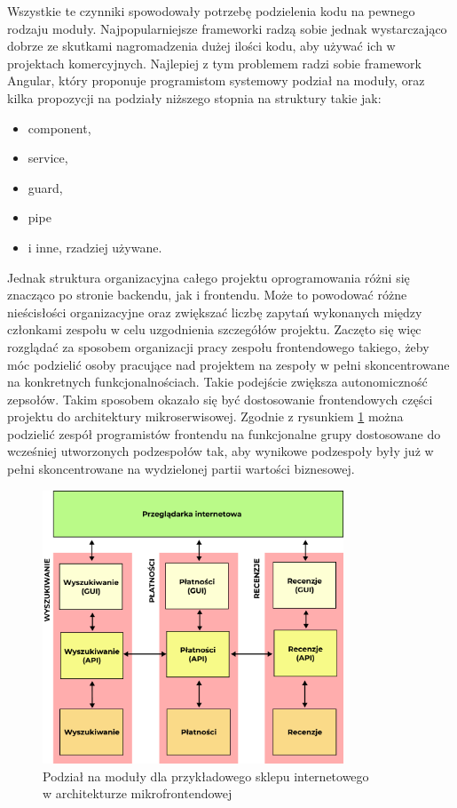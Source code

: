\documentclass{SGGW-thesis}
\begin{document}
Wszystkie te czynniki spowodowały potrzebę podzielenia kodu na pewnego rodzaju moduły. Najpopularniejsze frameworki radzą sobie jednak wystarczająco dobrze ze skutkami nagromadzenia dużej ilości kodu, aby używać ich w projektach komercyjnych. Najlepiej z tym problemem radzi sobie framework Angular, który proponuje programistom systemowy podział na moduły, oraz kilka propozycji na podziały niższego stopnia na struktury takie jak:

\begin{itemize}
	\item component,
	\item service,
	\item guard,
	\item pipe
	\item i inne, rzadziej używane.
\end{itemize}

Jednak struktura organizacyjna całego projektu oprogramowania różni się znacząco po stronie backendu, jak i frontendu. Może to powodować różne nieścisłości organizacyjne oraz zwiększać liczbę zapytań wykonanych między członkami zespołu w celu uzgodnienia szczegółów projektu. Zaczęto się więc rozglądać za sposobem organizacji pracy zespołu frontendowego takiego, żeby móc podzielić osoby pracujące nad projektem na zespoły w pełni skoncentrowane na konkretnych funkcjonalnościach. Takie podejście zwiększa autonomiczność zepsołów.
Takim sposobem okazało się być dostosowanie frontendowych części projektu do architektury mikroserwisowej. Zgodnie z rysunkiem \cref{fig:microfrontends_diagram} można podzielić zespół programistów frontendu na funkcjonalne grupy dostosowane do wcześniej utworzonych podzespołów tak, aby wynikowe podzespoły były już w pełni skoncentrowane na wydzielonej partii wartości biznesowej.

\begin{figure}[h]
	\centering
	\captionsetup{justification=centering}
	\includegraphics[width=0.8\textwidth]{microfrontends_diagram.png}
	\caption{Podział na moduły dla przykładowego sklepu internetowego \\ w architekturze mikrofrontendowej}
	\label{fig:microfrontends_diagram}
\end{figure}
\end{document}
